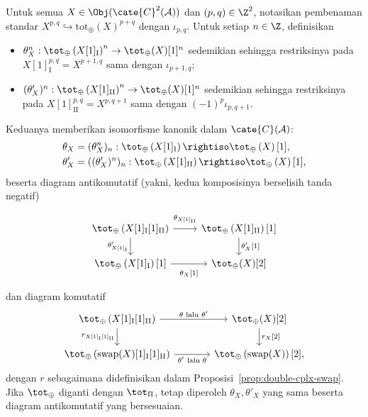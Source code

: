 \begin{proposisi}\label{prop:tot-shift}
	Untuk semua $X\in\Obj(\cate{C}^2(\mathcal{A}))$ dan
	$(p,q)\in\Z^2$, notasikan pembenaman standar
	$X^{p,q}\hookrightarrow\mathrm{tot}_{\oplus}(X)^{p+q}$ dengan
	$\iota_{p,q}$. Untuk setiap $n\in\Z$, definisikan
	\begin{itemize}
		\item $\theta_X^n:\tot_{\oplus}\left(X[1]_{\mathrm{I}}\right)^n\to
		\tot_{\oplus}(X)[1]^n$ sedemikian sehingga restriksinya pada
		$X[1]_{\mathrm{I}}^{p,q}=X^{p+1,q}$ sama dengan $\iota_{p+1,q}$;
		\item $(\theta'_X)^n:\tot_{\oplus}\left(X[1]_{\mathrm{II}}\right)^n
		\to\tot_{\oplus}(X)[1]^n$ sedemikian sehingga restriksinya pada
		$X[1]_{\mathrm{II}}^{p,q}=X^{p,q+1}$ sama dengan
		$(-1)^p\iota_{p,q+1}$.
	\end{itemize}
	Keduanya memberikan isomorfisme kanonik dalam $\cate{C}(\mathcal{A})$:
	\begin{align*}
		\theta_X & = (\theta_X^n)_n: \tot_{\oplus} \left( X[1]_{\mathrm{I}} \right) \rightiso \tot_{\oplus} \left(X\right)[1], \\
		\theta'_X & = ((\theta'_X)^n)_n: \tot_{\oplus} \left( X[1]_{\mathrm{II}} \right) \rightiso \tot_{\oplus} \left(X\right)[1],
	\end{align*}
	beserta diagram antikomutatif (yakni, kedua komposisinya berselisih tanda
	negatif)
	\[\begin{tikzcd}
		\tot_{\oplus} \left( X[1]_{\mathrm{I}}[1]_{\mathrm{II}}\right) \arrow[r, "{\theta_{X[1]_{\mathrm{II}}}}" inner sep=0.6em] \arrow[d, "{\theta'_{X[1]_{\mathrm{I}}}}"'] & \tot_{\oplus}\left(X[1]_{\mathrm{II}}\right)[1] \arrow[d, "{\theta'_X [1]}"] \\
		\tot_{\oplus} \left( X[1]_{\mathrm{I}}\right)[1] \arrow[r, "{\theta_X [1]}"' inner sep=0.6em] & \tot_{\oplus}(X)[2]
	\end{tikzcd}\]
	dan diagram komutatif
	\[\begin{tikzcd}[column sep=large]
		\tot_{\oplus} \left( X[1]_{\mathrm{I}}[1]_{\mathrm{II}} \right) \arrow[r, "\text{$\theta$ lalu $\theta'$}"] \arrow[d, "{r_{X[1]_{\mathrm{I}}[1]_{\mathrm{II}}}}"'] & \tot_{\oplus}(X)[2] \arrow[d, "{r_X[2]}"] \\
		\tot_{\oplus}\left( \mathrm{swap}(X)[1]_{\mathrm{I}}[1]_{\mathrm{II}} \right) \arrow[r, "\text{$\theta'$ lalu $\theta$}"'] & \tot_{\oplus}\left(\mathrm{swap}(X)\right)[2],
	\end{tikzcd}\]
	dengan $r$ sebagaimana didefinisikan dalam
	Proposisi~\ref{prop:double-cplx-swap}. Jika $\tot_{\oplus}$ diganti dengan
	$\tot_{\Pi}$, tetap diperoleh $\theta_X,\theta'_X$ yang sama beserta diagram
	antikomutatif yang bersesuaian.
\end{proposisi}
